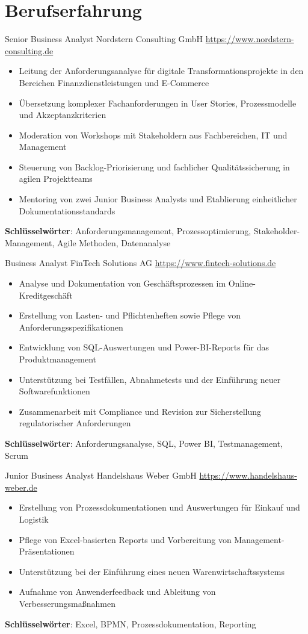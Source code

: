 \documentclass[a4paper, serif, 10pt]{moderncv}
\begin{document}
\section{Berufserfahrung}

        {Senior Business Analyst}
        {Nordstern Consulting GmbH}
        {\url{https://www.nordstern-consulting.de}}
        {}
        {\begin{itemize}
\item Leitung der Anforderungsanalyse für digitale Transformationsprojekte in den Bereichen Finanzdienstleistungen und E-Commerce
\item Übersetzung komplexer Fachanforderungen in User Stories, Prozessmodelle und Akzeptanzkriterien
\item Moderation von Workshops mit Stakeholdern aus Fachbereichen, IT und Management
\item Steuerung von Backlog-Priorisierung und fachlicher Qualitätssicherung in agilen Projektteams
\item Mentoring von zwei Junior Business Analysts und Etablierung einheitlicher Dokumentationsstandards
\end{itemize}
\textbf{Schlüsselwörter}: Anforderungsmanagement, Prozessoptimierung, Stakeholder-Management, Agile Methoden, Datenanalyse}

        {Business Analyst}
        {FinTech Solutions AG}
        {\url{https://www.fintech-solutions.de}}
        {}
        {\begin{itemize}
\item Analyse und Dokumentation von Geschäftsprozessen im Online-Kreditgeschäft
\item Erstellung von Lasten- und Pflichtenheften sowie Pflege von Anforderungsspezifikationen
\item Entwicklung von SQL-Auswertungen und Power-BI-Reports für das Produktmanagement
\item Unterstützung bei Testfällen, Abnahmetests und der Einführung neuer Softwarefunktionen
\item Zusammenarbeit mit Compliance und Revision zur Sicherstellung regulatorischer Anforderungen
\end{itemize}
\textbf{Schlüsselwörter}: Anforderungsanalyse, SQL, Power BI, Testmanagement, Scrum}

        {Junior Business Analyst}
        {Handelshaus Weber GmbH}
        {\url{https://www.handelshaus-weber.de}}
        {}
        {\begin{itemize}
\item Erstellung von Prozessdokumentationen und Auswertungen für Einkauf und Logistik
\item Pflege von Excel-basierten Reports und Vorbereitung von Management-Präsentationen
\item Unterstützung bei der Einführung eines neuen Warenwirtschaftssystems
\item Aufnahme von Anwenderfeedback und Ableitung von Verbesserungsmaßnahmen
\end{itemize}
\textbf{Schlüsselwörter}: Excel, BPMN, Prozessdokumentation, Reporting}
\end{document}
